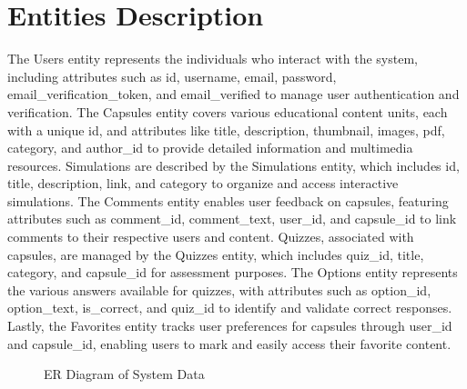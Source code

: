 \section*{Entities Description}
The Users entity represents the individuals who interact with the system, including attributes such as id, username, email, password, email\_verification\_token, and email\_verified to manage user authentication and verification. The Capsules entity covers various educational content units, each with a unique id, and attributes like title, description, thumbnail, images, pdf, category, and author\_id to provide detailed information and multimedia resources. Simulations are described by the Simulations entity, which includes id, title, description, link, and category to organize and access interactive simulations. The Comments entity enables user feedback on capsules, featuring attributes such as comment\_id, comment\_text, user\_id, and capsule\_id to link comments to their respective users and content. Quizzes, associated with capsules, are managed by the Quizzes entity, which includes quiz\_id, title, category, and capsule\_id for assessment purposes. The Options entity represents the various answers available for quizzes, with attributes such as option\_id, option\_text, is\_correct, and quiz\_id to identify and validate correct responses. Lastly, the Favorites entity tracks user preferences for capsules through user\_id and capsule\_id, enabling users to mark and easily access their favorite content.
\begin{figure}[H]
    \centering
    \caption{ER Diagram of System Data}
\end{figure}
\newpage
